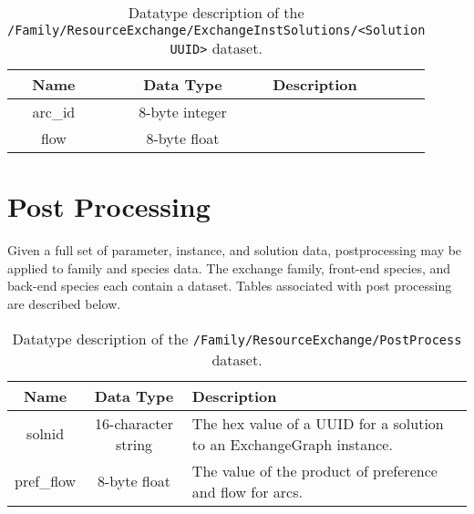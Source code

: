 \begin{table}[h!]
\centering
\label{tbl:/Family/ResourceExchange/ExchangeInstSolutions/id_2fa2ee6eb9654baf8780a99713dd5e69}
\caption{Datatype description of the \lstinline[basicstyle=\ttfamily\color{black}]|/Family/ResourceExchange/ExchangeInstSolutions/<Solution UUID>| dataset.}
\begin{tabularx}{\columnwidth-10pt}{|c|c|X|} %
\hline
\textbf{Name} & \textbf{Data Type} & \textbf{Description}       \\ \hline
arc\_id & 8-byte integer &  \\ \hline
flow & 8-byte float &  \\ \hline
\end{tabularx}
\end{table}

\section{Post Processing}

Given a full set of parameter, instance, and solution data, postprocessing may
be applied to family and species data. The exchange family, front-end species,
and back-end species each contain a  dataset. Tables
associated with post processing are described below.

\begin{table}[h!]
\centering
\label{tbl:/Family/ResourceExchange/PostProcess}
\caption{Datatype description of the \lstinline[basicstyle=\ttfamily\color{black}]|/Family/ResourceExchange/PostProcess| dataset.}
\begin{tabularx}{\columnwidth-10pt}{|c|c|X|} %
\hline
\textbf{Name} & \textbf{Data Type} & \textbf{Description}       \\ \hline
solnid & 16-character string & The hex value of a UUID for a solution to an ExchangeGraph instance. \\ \hline
pref\_flow & 8-byte float & The value of the product of preference and flow for arcs. \\ \hline
\end{tabularx}
\end{table}

